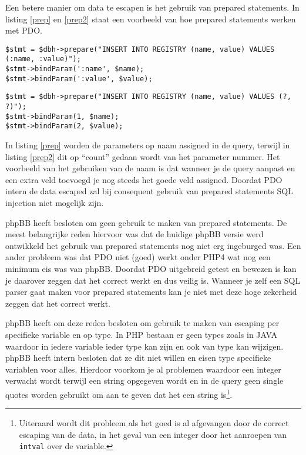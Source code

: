 Een betere manier om data te escapen is het gebruik van prepared statements. In listing \ref{prep} en \ref{prep2} staat een voorbeeld van hoe prepared statements werken met PDO. 
\begin{lstlisting}[label=prep,caption=Prepared statements in PHP\cite{bib.php.prep}]
$stmt = $dbh->prepare("INSERT INTO REGISTRY (name, value) VALUES (:name, :value)");
$stmt->bindParam(':name', $name);
$stmt->bindParam(':value', $value);
\end{lstlisting}
\begin{lstlisting}[label=prep2,caption=Prepared statements in PHP\cite{bib.php.prep}]
$stmt = $dbh->prepare("INSERT INTO REGISTRY (name, value) VALUES (?, ?)");
$stmt->bindParam(1, $name);
$stmt->bindParam(2, $value);
\end{lstlisting}
In listing \ref{prep} worden de parameters op naam assigned in de query, terwijl in listing \ref{prep2} dit op ``count'' gedaan wordt van het parameter nummer. Het voorbeeld van het gebruiken van de naam is dat wanneer je de query aanpast en een extra veld toevoegd je nog steeds het goede veld assigned.
Doordat PDO intern de data escaped zal bij consequent gebruik van prepared statements SQL injection niet mogelijk zijn.

phpBB heeft besloten om geen gebruik te maken van prepared statements. De meest belangrijke reden hiervoor was dat de huidige phpBB versie werd ontwikkeld het gebruik van prepared statements nog niet erg ingeburged was. Een ander probleem was dat PDO niet (goed) werkt onder PHP4 wat nog een minimum eis was van phpBB. Doordat PDO  uitgebreid getest en bewezen is kan je daarover zeggen dat het correct werkt en dus veilig is. Wanneer je zelf een SQL parser gaat maken voor prepared statements kan je niet met deze hoge zekerheid zeggen dat het correct werkt. 

phpBB heeft om deze reden besloten om gebruik te maken van escaping per specifieke variable en op type. In PHP bestaan er geen types zoals in JAVA waardoor in iedere variable ieder type kan zijn en ook van type kan wijzigen. phpBB heeft intern besloten dat ze dit niet willen en eisen type specifieke variablen voor alles. Hierdoor voorkom je al problemen waardoor een integer verwacht wordt terwijl een string opgegeven wordt en in de query geen single quotes worden gebruikt om aan te geven dat het een string is\footnote{Uiteraard wordt dit probleem als het goed is al afgevangen door de correct escaping van de data, in het geval van een integer door het aanroepen van \texttt{intval} over de variable.}.

